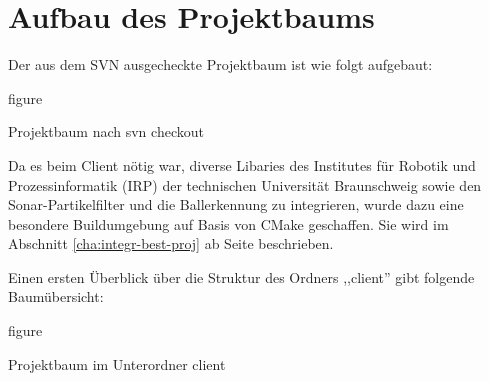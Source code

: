 
\section{Aufbau des Projektbaums}
\label{sec:aufbau_projektbaum}
Der aus dem SVN ausgecheckte Projektbaum  ist wie folgt aufgebaut:\\%

\begin{nofloat}{figure}%
\centering
{}
\caption{Projektbaum nach svn checkout}  
\end{nofloat}
Da es beim Client nötig war, diverse Libaries des Institutes für
Robotik und Prozessinformatik (IRP) der technischen Universität
Braunschweig sowie den Sonar-Partikelfilter und die Ballerkennung zu
integrieren, wurde dazu eine besondere Buildumgebung auf Basis von
CMake geschaffen. Sie
wird im Abschnitt \ref{cha:integr-best-proj} ab Seite
\pageref{cha:integr-best-proj} beschrieben.   

Einen ersten Überblick
über die Struktur des Ordners ,,client'' gibt folgende Baumübersicht:\\

\begin{nofloat}{figure}%
\centering
{}
  \caption{Projektbaum im Unterordner client}
\end{nofloat}  
  
